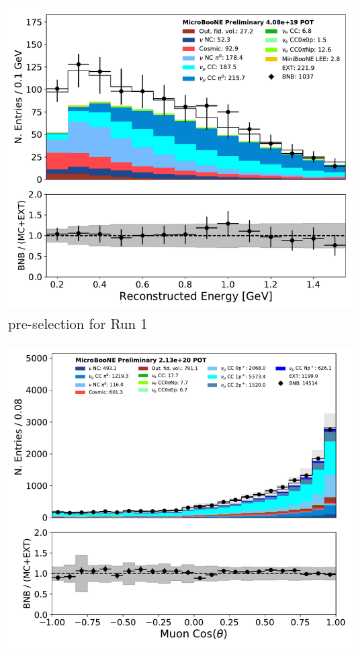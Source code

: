 \begin{figure}[ht] 
\begin{center}
    \begin{subfigure}[b]{0.3\textwidth}
    \centering
    \includegraphics[width=1.00\textwidth]{1eNp/reco_e_03122020_RUN1_preselection.pdf}
    \caption{\label{fig:datamccomparisons:nuepresel} \npsel pre-selection for Run  1}
    \end{subfigure}
    \begin{subfigure}[b]{0.3\textwidth}
    \centering
    \includegraphics[width=1.00\textwidth]{NuMuCCsel/Images/Ryan/fullselection_run3_fullsystematics/trk_cos_theta_v_07232020_fullsel_samples_detsys_event_category.pdf}

\end{subfigure}
\end{center}
\end{figure}
